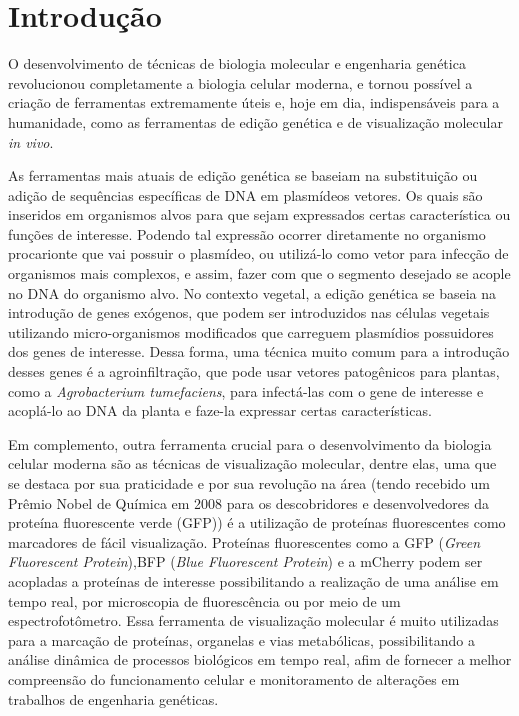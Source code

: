 \section{Introdução} 
O desenvolvimento de técnicas de biologia molecular e engenharia genética revolucionou completamente a biologia celular moderna, e tornou possível a criação de ferramentas extremamente úteis e, hoje em dia, indispensáveis para a humanidade\cite{teófilo_gallão_2019}, como as ferramentas de edição genética e de visualização molecular \textit{in vivo}.

As ferramentas mais atuais de edição genética se baseiam na substituição ou adição de sequências específicas de DNA em plasmídeos vetores\cite{BriefyHistoryOfGenetics}. Os quais são inseridos em organismos alvos para que sejam expressados certas característica ou funções de interesse. Podendo tal expressão ocorrer diretamente no organismo procarionte que vai possuir o plasmídeo\cite{ruiz_silhavy_2022}, ou utilizá-lo como vetor para infecção de organismos mais complexos, e assim, fazer com que o segmento desejado se acople no DNA do organismo alvo. No contexto vegetal, a edição genética se baseia na introdução de genes exógenos, que podem ser introduzidos nas células vegetais utilizando micro-organismos modificados que carreguem plasmídios possuidores dos genes de interesse\cite{embrapa2017manual}. Dessa forma, uma técnica muito comum para a introdução desses genes é a agroinfiltração, que pode usar vetores patogênicos para plantas, como a \textit{Agrobacterium tumefaciens}, para infectá-las com o gene de interesse e acoplá-lo ao DNA da planta e faze-la expressar certas características\cite{embrapa2017manual}.

Em complemento, outra ferramenta crucial para o desenvolvimento da biologia celular moderna são as técnicas de visualização molecular, dentre elas, uma que se destaca por sua praticidade e por sua revolução na área (tendo recebido um Prêmio Nobel de Química em 2008 para os descobridores e desenvolvedores da proteína fluorescente verde (GFP)\cite{jeremy_jackson_2009}) é a utilização de proteínas fluorescentes como marcadores de fácil visualização. Proteínas fluorescentes como a GFP (\textit{Green Fluorescent Protein}),BFP (\textit{Blue Fluorescent Protein}) e a mCherry podem ser acopladas a proteínas de interesse possibilitando a realização de uma análise em tempo real, por microscopia de fluorescência ou por meio de um espectrofotômetro.  Essa ferramenta de visualização molecular é muito utilizadas para a marcação de proteínas, organelas e vias metabólicas, possibilitando a análise dinâmica de processos biológicos em tempo real, afim de fornecer a melhor compreensão do funcionamento celular e monitoramento de alterações em trabalhos de engenharia genéticas\cite{misteli_spector_1997}. 

